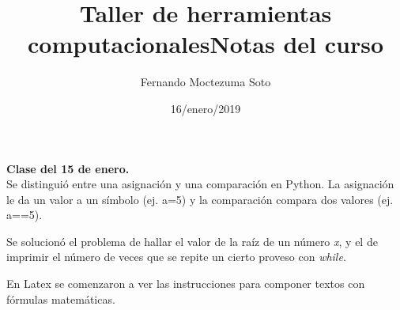 \documentclass[etterpaper, 12pt, oneside]{article}%
\title{\Huge Taller de herramientas computacionales}
\author{Fernando Moctezuma Soto}
\date{16/enero/2019}
\begin{document}
	\maketitle
	
	\newpage
	
	\title{\Huge Notas del curso\\}
	
	\textbf{Clase del 15 de enero.}\\
	
	Se distinguió entre una asignación y una comparación en Python. La asignación le da un valor a un símbolo (ej. a=5) y la comparación compara dos valores (ej. a==5).
	
	Se solucionó el problema de hallar el valor de la raíz de un número \emph x, y el de imprimir el número de veces que se repite un cierto proveso con \emph{while}.
	
	En Latex se comenzaron a ver las instrucciones para componer textos con fórmulas matemáticas.
	
	
\end{document}
